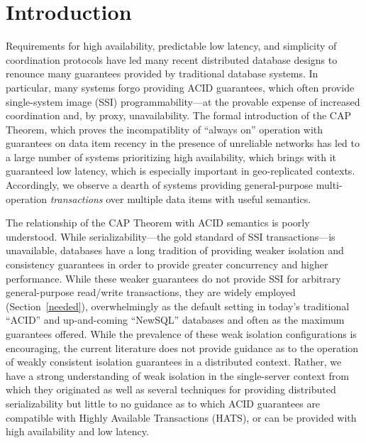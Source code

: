 

\section{Introduction}

Requirements for high availability, predictable low latency, and
simplicity of coordination protocols have led many recent distributed
database designs to renounce many guarantees provided by traditional
database systems. In particular, many systems forgo providing ACID
guarantees, which often provide single-system image (SSI)
programmability---at the provable expense of increased coordination
and, by proxy, unavailability. The formal introduction of the CAP
Theorem, which proves the incompatiblity of ``always on'' operation
with guarantees on data item recency in the presence of unreliable
networks has led to a large number of systems prioritizing high
availability, which brings with it guaranteed low latency, which is especially
important in geo-replicated contexts. Accordingly, we observe a dearth
of systems providing general-purpose multi-operation
\textit{transactions} over multiple data items with useful semantics.

The relationship of the CAP Theorem with ACID semantics is poorly
understood. While serializability---the gold standard of SSI
transactions---is unavailable, databases have a long tradition of
providing weaker isolation and consistency guarantees in order to
provide greater concurrency and higher performance. While these weaker
guarantees do not provide SSI for arbitrary general-purpose read/write
transactions, they are widely employed (Section~\ref{needed}),
overwhelmingly as the default setting in today's traditional ``ACID''
and up-and-coming ``NewSQL'' databases and often as the maximum
guarantees offered. While the prevalence of these weak isolation
configurations is encouraging, the current literature does not provide
guidance as to the operation of weakly consistent isolation guarantees
in a distributed context. Rather, we have a strong understanding of
weak isolation in the single-server context from which they originated
as well as several techniques for providing distributed
serializability but little to no guidance as to which ACID guarantees
are compatible with Highly Available Transactions (HATS), or can be
provided with high availability and low latency.

